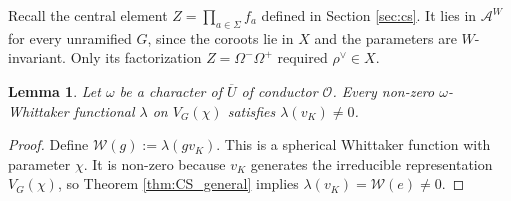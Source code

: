 \documentclass[12pt]{article}
\numberwithin{equation}{section}
\newtheorem{lemma}[theorem]{Lemma}
\theoremstyle{definition}
\theoremstyle{remark}
\theoremstyle{plain}
\begin{document}
Recall the central element $Z = \prod_{a\in\Sigma}f_a$ defined in Section \ref{sec:cs}. It lies in $\mathcal{A}^W$ for every unramified $G$, since the coroots lie in $X$ and the parameters are $W$-invariant. Only its factorization $Z = \Omega^-\Omega^+$ required $\rho^\vee \in X$.

\begin{lemma}\label{lem:functional_nonvanishing}
Let $\omega$ be a character of $\overline U$ of conductor $\mathcal O$. Every non-zero $\omega$-Whittaker functional $\lambda$ on $V_G(\chi)$ satisfies $\lambda(v_K)\neq0$.
\end{lemma}
\begin{proof}
Define $\mathcal W(g):=\lambda(gv_K)$. This is a spherical Whittaker function with parameter $\chi$. It is non-zero because $v_K$ generates the irreducible representation $V_G(\chi)$, so Theorem \ref{thm:CS_general} implies $\lambda(v_K)=\mathcal W(e)\neq0$.
\end{proof}
\end{document}
